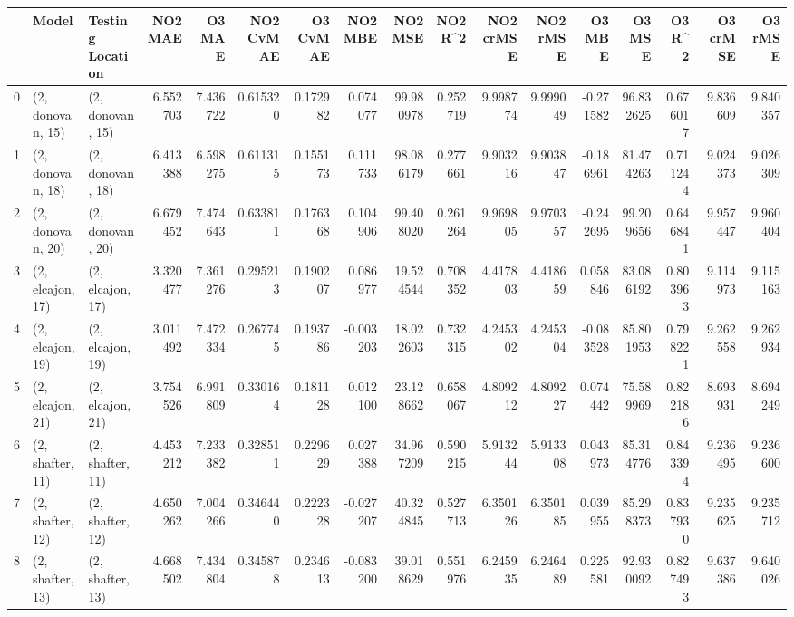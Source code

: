 \begin{tabular}{lllrrrrrrrrrrrrrr}
\toprule
{} &             Model &  Testing Location &   NO2 MAE &    O3 MAE &  NO2 CvMAE &  O3 CvMAE &   NO2 MBE &     NO2 MSE &   NO2 R\textasciicircum2 &  NO2 crMSE &   NO2 rMSE &    O3 MBE &      O3 MSE &    O3 R\textasciicircum2 &   O3 crMSE &    O3 rMSE \\
\midrule
0  &  (2, donovan, 15) &  (2, donovan, 15) &  6.552703 &  7.436722 &   0.615320 &  0.172982 &  0.074077 &   99.980978 &  0.252719 &   9.998774 &   9.999049 & -0.271582 &   96.832625 &  0.676017 &   9.836609 &   9.840357 \\
1  &  (2, donovan, 18) &  (2, donovan, 18) &  6.413388 &  6.598275 &   0.611315 &  0.155173 &  0.111733 &   98.086179 &  0.277661 &   9.903216 &   9.903847 & -0.186961 &   81.474263 &  0.711244 &   9.024373 &   9.026309 \\
2  &  (2, donovan, 20) &  (2, donovan, 20) &  6.679452 &  7.474643 &   0.633811 &  0.176368 &  0.104906 &   99.408020 &  0.261264 &   9.969805 &   9.970357 & -0.242695 &   99.209656 &  0.646841 &   9.957447 &   9.960404 \\
3  &  (2, elcajon, 17) &  (2, elcajon, 17) &  3.320477 &  7.361276 &   0.295213 &  0.190207 &  0.086977 &   19.524544 &  0.708352 &   4.417803 &   4.418659 &  0.058846 &   83.086192 &  0.803963 &   9.114973 &   9.115163 \\
4  &  (2, elcajon, 19) &  (2, elcajon, 19) &  3.011492 &  7.472334 &   0.267745 &  0.193786 & -0.003203 &   18.022603 &  0.732315 &   4.245302 &   4.245304 & -0.083528 &   85.801953 &  0.798221 &   9.262558 &   9.262934 \\
5  &  (2, elcajon, 21) &  (2, elcajon, 21) &  3.754526 &  6.991809 &   0.330164 &  0.181128 &  0.012100 &   23.128662 &  0.658067 &   4.809212 &   4.809227 &  0.074442 &   75.589969 &  0.822186 &   8.693931 &   8.694249 \\
6  &  (2, shafter, 11) &  (2, shafter, 11) &  4.453212 &  7.233382 &   0.328511 &  0.229629 &  0.027388 &   34.967209 &  0.590215 &   5.913244 &   5.913308 &  0.043973 &   85.314776 &  0.843394 &   9.236495 &   9.236600 \\
7  &  (2, shafter, 12) &  (2, shafter, 12) &  4.650262 &  7.004266 &   0.346440 &  0.222328 & -0.027207 &   40.324845 &  0.527713 &   6.350126 &   6.350185 &  0.039955 &   85.298373 &  0.837930 &   9.235625 &   9.235712 \\
8  &  (2, shafter, 13) &  (2, shafter, 13) &  4.668502 &  7.434804 &   0.345878 &  0.234613 & -0.083200 &   39.018629 &  0.551976 &   6.245935 &   6.246489 &  0.225581 &   92.930092 &  0.827493 &   9.637386 &   9.640026 \\

\end{tabular}
